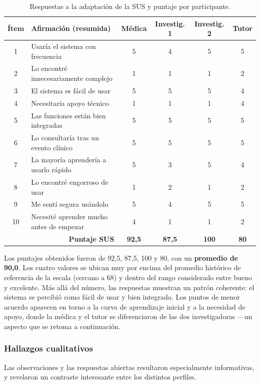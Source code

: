 \begin{table}[h]
\centering
\footnotesize
\setlength{\tabcolsep}{4pt}
\begin{tabular}{c l c c c c}
\hline
\textbf{Ítem} & \textbf{Afirmación (resumida)} & \textbf{Médica} & \textbf{Investig. 1} & \textbf{Investig. 2} & \textbf{Tutor} \\
\hline
1 & Usaría el sistema con frecuencia & 5 & 4 & 5 & 5 \\
2 & Lo encontré innecesariamente complejo & 1 & 1 & 1 & 2 \\
3 & El sistema es fácil de usar & 5 & 5 & 5 & 4 \\
4 & Necesitaría apoyo técnico & 1 & 1 & 1 & 4 \\
5 & Las funciones están bien integradas & 5 & 5 & 5 & 5 \\
6 & Lo consultaría tras un evento clínico & 5 & 5 & 5 & 5 \\
7 & La mayoría aprendería a usarlo rápido & 5 & 3 & 5 & 4 \\
8 & Lo encontré engorroso de usar & 1 & 2 & 1 & 2 \\
9 & Me sentí segura usándolo & 5 & 4 & 5 & 5 \\
10 & Necesité aprender mucho antes de empezar & 4 & 1 & 1 & 2 \\
\hline
\multicolumn{2}{r}{\textbf{Puntaje SUS}} & \textbf{92,5} & \textbf{87,5} & \textbf{100} & \textbf{80} \\
\hline
\end{tabular}
\caption{Respuestas a la adaptación de la SUS y puntaje por participante.}
\end{table}
Los puntajes obtenidos fueron de 92,5, 87,5, 100 y 80, con un \textbf{promedio de 90,0}. Los cuatro valores se ubican muy por encima del promedio histórico de referencia de la escala (cercano a 68) y dentro del rango considerado entre bueno y excelente. Más allá del número, las respuestas muestran un patrón coherente: el sistema se percibió como fácil de usar y bien integrado. Los puntos de menor acuerdo aparecen en torno a la curva de aprendizaje inicial y a la necesidad de apoyo, donde la médica y el tutor se diferenciaron de las dos investigadoras —un aspecto que se retoma a continuación.\\


\subsubsection{Hallazgos cualitativos}
Las observaciones y las respuestas abiertas resultaron especialmente informativas, y revelaron un contraste interesante entre los distintos perfiles.\\

